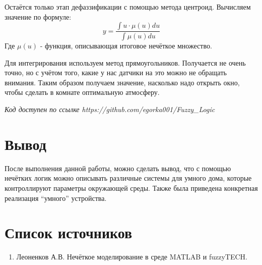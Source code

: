 \documentclass[a4paper]{article}
\begin{document}
Остаётся только этап дефаззификации с помощью метода центроид.
Вычисляем значение по формуле:
$$y = \frac{\int u \cdot \mu(u) du}{\int \mu(u)du}$$
Где $\mu(u)$ - функция, описывающая итоговое нечёткое множество.

Для интегрирования используем метод прямоугольников. 
Получается не очень точно, но с учётом того, какие у нас
датчики на это можно не обращать внимания.
Таким образом получаем значение, насколько надо открыть окно, чтобы 
сделать в комнате оптимальную атмосферу.

{\itshape Код доступен по ссылке https://github.com/egorka001/Fuzzy\_Logic}

\section{Вывод}
После выполнения данной работы, можно сделать вывод, что с помощью
нечётких логик можно описывать различные системы для умного дома,
которые контроллируют параметры окружающей среды. Также была приведена 
конкретная реализация “умного” устройства. 

\section{Список источников}
\begin{enumerate}
    \item  Леоненков А.В. Нечёткое моделирование в среде MATLAB и fuzzyTECH.
\end{enumerate}
\end{document}
